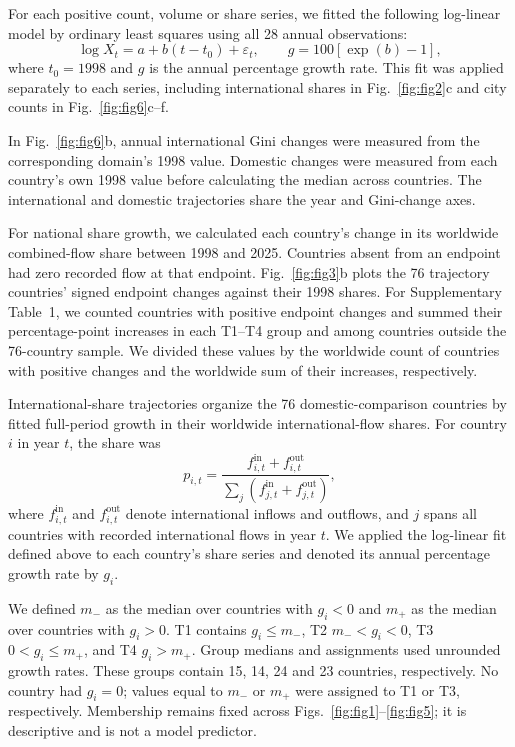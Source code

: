 For each positive count, volume or share series, we fitted the following log-linear model by ordinary least squares using all 28 annual observations:
\begin{equation*}
\log X_t=a+b(t-t_0)+\varepsilon_t,\qquad
g=100[\exp(b)-1],
\end{equation*}
where $t_0=1998$ and $g$ is the annual percentage growth rate. This fit was applied separately to each series, including international shares in Fig.~\ref{fig:fig2}c and city counts in Fig.~\ref{fig:fig6}c--f.

In Fig.~\ref{fig:fig6}b, annual international Gini changes were measured from the corresponding domain's 1998 value. Domestic changes were measured from each country's own 1998 value before calculating the median across countries. The international and domestic trajectories share the year and Gini-change axes.

For national share growth, we calculated each country's change in its worldwide combined-flow share between 1998 and 2025. Countries absent from an endpoint had zero recorded flow at that endpoint. Fig.~\ref{fig:fig3}b plots the 76 trajectory countries' signed endpoint changes against their 1998 shares. For Supplementary Table~1, we counted countries with positive endpoint changes and summed their percentage-point increases in each T1--T4 group and among countries outside the 76-country sample. We divided these values by the worldwide count of countries with positive changes and the worldwide sum of their increases, respectively.

International-share trajectories organize the 76 domestic-comparison countries by fitted full-period growth in their worldwide international-flow shares. For country $i$ in year $t$, the share was
\begin{equation*}
p_{i,t}=\frac{f^{\mathrm{in}}_{i,t}+f^{\mathrm{out}}_{i,t}}
{\sum_j\left(f^{\mathrm{in}}_{j,t}+f^{\mathrm{out}}_{j,t}\right)},
\end{equation*}
where $f^{\mathrm{in}}_{i,t}$ and $f^{\mathrm{out}}_{i,t}$ denote international inflows and outflows, and $j$ spans all countries with recorded international flows in year $t$. We applied the log-linear fit defined above to each country's share series and denoted its annual percentage growth rate by $g_i$.

We defined $m_-$ as the median over countries with $g_i<0$ and $m_+$ as the median over countries with $g_i>0$. T1 contains $g_i\leq m_-$, T2 $m_-<g_i<0$, T3 $0<g_i\leq m_+$, and T4 $g_i>m_+$. Group medians and assignments used unrounded growth rates. These groups contain 15, 14, 24 and 23 countries, respectively. No country had $g_i=0$; values equal to $m_-$ or $m_+$ were assigned to T1 or T3, respectively. Membership remains fixed across Figs.~\ref{fig:fig1}--\ref{fig:fig5}; it is descriptive and is not a model predictor.

